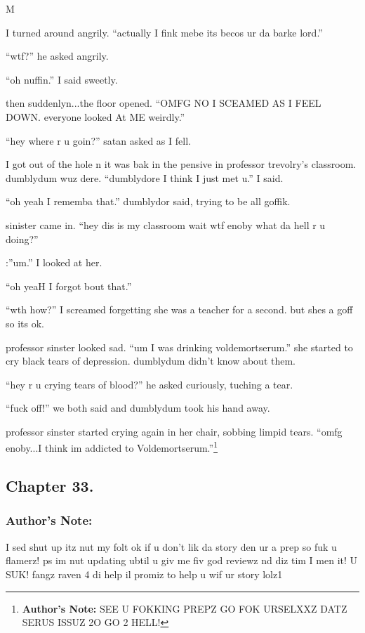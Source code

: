 M\documentclass{article}
\begin{document}
I turned around angrily. “actually I fink mebe its becos ur da barke lord.”

“wtf?” he asked angrily.

“oh nuffin.” I said sweetly.

then suddenlyn...the floor opened. “OMFG NO I SCEAMED AS I FEEL DOWN. everyone looked At ME weirdly.”

“hey where r u goin?” satan asked as I fell.

I got out of the hole n it was bak in the pensive in professor trevolry’s classroom. dumblydum wuz dere. “dumblydore I think I just met u.” I said.

“oh yeah I rememba that.” dumblydor said, trying to be all goffik.

sinister came in. “hey dis is my classroom wait wtf enoby what da hell r u doing?”

:”um.” I looked at her.

“oh yeaH I forgot bout that.”

“wth how?” I screamed forgetting she was a teacher for a second. but shes a goff so its ok.

professor sinster looked sad. “um I was drinking voldemortserum.” she started to cry black tears of depression. dumblydum didn’t know about them.

“hey r u crying tears of blood?” he asked curiously, tuching a tear.

“fuck off!” we both said and dumblydum took his hand away.

professor sinster started crying again in her chair, sobbing limpid tears. “omfg enoby...I think im addicted to Voldemortserum.”\footnote{\textbf{Author's Note: }SEE U FOKKING PREPZ GO FOK URSELXXZ DATZ SERUS ISSUZ 2O GO 2 HELL!}

\clearpage\nolinenumbers
\subsection*{Chapter 33.}

\subsubsection*{Author's Note: }I sed shut up itz nut my folt ok if u don’t lik da story den ur a prep so fuk u flamerz! ps im nut updating ubtil u giv me fiv god reviewz nd diz tim I men it! U SUK! fangz raven 4 di help il promiz to help u wif ur story lolz1

\textbreak
\linenumbers\resetlinenumber
\end{document}
